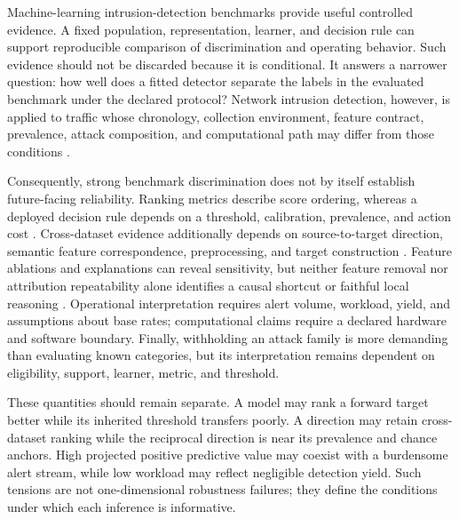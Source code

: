 \documentclass[preprint,12pt]{elsarticle}
\begin{document}
Machine-learning intrusion-detection benchmarks provide useful controlled evidence. A fixed population, representation, learner, and decision rule can support reproducible comparison of discrimination and operating behavior. Such evidence should not be discarded because it is conditional. It answers a narrower question: how well does a fitted detector separate the labels in the evaluated benchmark under the declared protocol? Network intrusion detection, however, is applied to traffic whose chronology, collection environment, feature contract, prevalence, attack composition, and computational path may differ from those conditions \cite{sommer2010closed,ring2019survey,arp2022dos}.

Consequently, strong benchmark discrimination does not by itself establish future-facing reliability. Ranking metrics describe score ordering, whereas a deployed decision rule depends on a threshold, calibration, prevalence, and action cost \cite{saito2015precision,axelsson2000baserate}. Cross-dataset evidence additionally depends on source-to-target direction, semantic feature correspondence, preprocessing, and target construction \cite{dhooge2020interdataset,layeghy2023crossdomain}. Feature ablations and explanations can reveal sensitivity, but neither feature removal nor attribution repeatability alone identifies a causal shortcut or faithful local reasoning \cite{engelen2021troubleshooting,arp2022dos,ribeiro2016lime,lundberg2017shap,yeh2019infidelity}. Operational interpretation requires alert volume, workload, yield, and assumptions about base rates; computational claims require a declared hardware and software boundary. Finally, withholding an attack family is more demanding than evaluating known categories, but its interpretation remains dependent on eligibility, support, learner, metric, and threshold.

These quantities should remain separate. A model may rank a forward target better while its inherited threshold transfers poorly. A direction may retain cross-dataset ranking while the reciprocal direction is near its prevalence and chance anchors. High projected positive predictive value may coexist with a burdensome alert stream, while low workload may reflect negligible detection yield. Such tensions are not one-dimensional robustness failures; they define the conditions under which each inference is informative.
\end{document}
